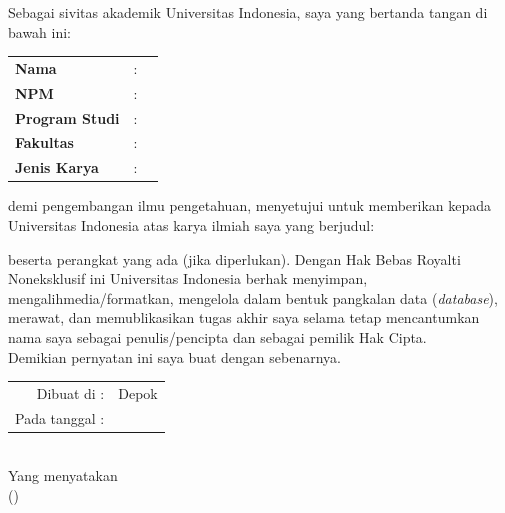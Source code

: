 % 
% 



\vspace*{0.2cm}
\noindent 
Sebagai sivitas akademik Universitas Indonesia, saya yang bertanda 
tangan di bawah ini:
\vspace*{0.4cm}


\begin{tabular}{p{4.2cm} l p{6cm}}
	\textbf{Nama} & : & \penulis \\ 	
	\textbf{NPM} & : & \npm \\
	\textbf{Program Studi} & : & \program\\	
	\textbf{Fakultas} & : & \fakultas\\
	\textbf{Jenis Karya} & : & \type \\
\end{tabular}

\vspace*{0.6cm}
\noindent demi pengembangan ilmu pengetahuan, menyetujui untuk memberikan 
kepada Universitas Indonesia  atas karya ilmiah saya yang berjudul:
\begin{center}
	\judul
\end{center}
beserta perangkat yang ada (jika diperlukan). Dengan Hak Bebas Royalti 
Noneksklusif ini Universitas Indonesia berhak menyimpan, 
mengalihmedia/formatkan, mengelola dalam bentuk pangkalan data 
(\textit{database}), merawat, dan memublikasikan tugas akhir saya selama 
tetap mencantumkan nama saya sebagai penulis/pencipta dan sebagai 
pemilik Hak Cipta. \\

\noindent Demikian pernyatan ini saya buat dengan sebenarnya.

\begin{center}
	\vspace*{0.8cm}
	\begin{tabular}{rl}
		Dibuat di : & Depok \\
		Pada tanggal : & \tanggalPengesahan \\
	\end{tabular}\\

	\vspace*{0.2cm}
	Yang menyatakan \\
	\vspace*{1.1cm}
	(\penulis)
\end{center}

\newpage

